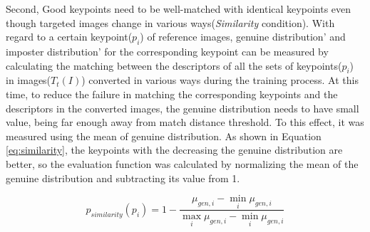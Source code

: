 
Second, Good keypoints need to be well-matched with identical keypoints even though targeted images change in various ways(\textit{Similarity} condition). With regard to a certain keypoint($p_i$) of reference images, genuine distribution' and imposter distribution' for the corresponding keypoint can be measured by calculating the matching between the descriptors of all the sets of keypoints($p_i$) in images($T_t(I)$) converted in various ways  during the training process. At this time, to reduce the failure in matching the corresponding keypoints and the descriptors in the converted images, the genuine distribution needs to have small value, being far enough away from match distance threshold. To this effect, it was measured using the mean of genuine distribution. As shown in Equation \eqref{eq:similarity}, the keypoints with the decreasing the genuine distribution are better, so the evaluation function was calculated by normalizing the mean of the genuine distribution and subtracting its value from 1.  

\begin{equation} \label{eq:similarity}
p_{similarity}(p_i) = 1 - \frac{\mu_{gen,i} - \min_i \mu_{gen,i}}{\max_i \mu_{gen, i} - \min_i \mu_{gen,i}}
\end{equation}	


